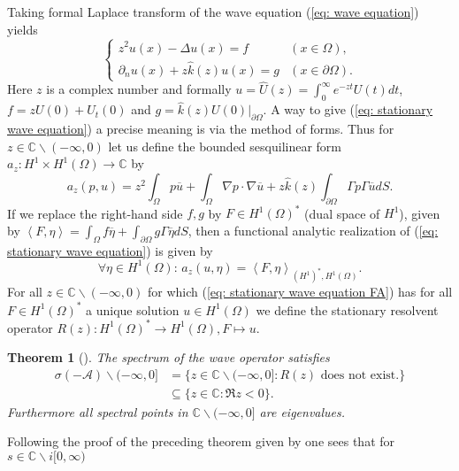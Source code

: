 \documentclass{amsart}
\newcommand{\dual}[2]{\left\langle #1 , #2\right\rangle}
\newcommand{\A}{\mathcal{A}}
\newcommand{\C}{\mathbb{C}}
\newtheorem{Theorem}{Theorem}
\begin{document}
Taking formal Laplace transform of the wave equation (\ref{eq: wave equation}) yields
\begin{equation}\label{eq: stationary wave equation}
 \begin{cases}
   z^2u(x) - \Delta u(x) = f & (x\in\Omega), \\
   \partial_n u(x) + z\hat{k}(z)u(x) = g &  (x\in\partial\Omega).
 \end{cases}
\end{equation}
Here $z$ is a complex number and formally $u=\hat{U}(z)=\int_0^{\infty} e^{-zt}U(t)dt$, $f=zU(0)+U_t(0)$ and $g=\hat{k}(z)U(0)|_{\partial\Omega}$. A way to give (\ref{eq: stationary wave equation}) a precise meaning is via the method of forms. Thus for $z\in\C\backslash(-\infty,0)$ let us define the bounded sesquilinear form $a_z:H^1\times H^1(\Omega)\rightarrow\C$ by
\begin{equation}\nonumber
 a_z(p, u) = z^2\int_{\Omega}p\overline{u} + \int_{\Omega} \nabla p \cdot\nabla\overline{u} + z\hat{k}(z)\int_{\partial\Omega} \Gamma p\Gamma \overline{u} dS. 
\end{equation}
If we replace the right-hand side $f,g$ by $F\in H^1(\Omega)^*$ (dual space of $H^1$), given by $\dual{F}{\eta}=\int_{\Omega}f\overline{\eta}+\int_{\partial\Omega} g\Gamma\overline{\eta}dS$, then a functional analytic realization of (\ref{eq: stationary wave equation}) is given by
\begin{equation}\label{eq: stationary wave equation FA}
 \forall \eta\in H^1(\Omega):\, a_z(u,\eta) = \dual{F}{\eta}_{(H^1)^*,H^1(\Omega)} .
\end{equation}
For all $z\in\C\backslash(-\infty,0)$ for which (\ref{eq: stationary wave equation FA}) has for all $F\in H^1(\Omega)^*$ a unique solution $u\in H^1(\Omega)$ we define the stationary resolvent operator $R(z):H^1(\Omega)^*\rightarrow H^1(\Omega), F\mapsto u$.
\begin{Theorem}[\cite{DFMP2010a}]\label{thm: spectrum DFMP}
 The spectrum of the wave operator satisfies
 \begin{align*}
  \sigma(-\A)\backslash(-\infty,0] &= \{z\in\C\backslash(-\infty,0]: R(z) \text{ does not exist.}\} \\
  &\subseteq \{z\in\C: \Re z < 0\}.
 \end{align*}
 Furthermore all spectral points in $\C\backslash(-\infty,0]$ are eigenvalues.
\end{Theorem}
Following the proof of the preceding theorem given by \cite{DFMP2010a} one sees that for $s\in\C\backslash i[0,\infty)$
\end{document}

